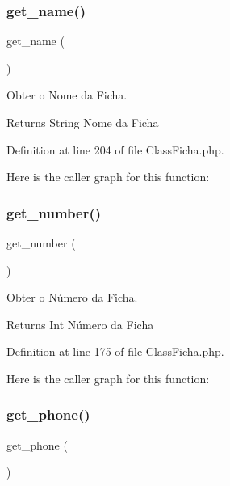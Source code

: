 \subsubsection{\texorpdfstring{get\+\_\+name()}{get\_name()}}
{\footnotesize\ttfamily get\+\_\+name (\begin{DoxyParamCaption}{ }\end{DoxyParamCaption})}



Obter o Nome da Ficha. 

\begin{DoxyReturn}{Returns}
String Nome da Ficha 
\end{DoxyReturn}


Definition at line 204 of file Class\+Ficha.\+php.

Here is the caller graph for this function\+:
\mbox{\label{class_class_ficha_a4f7969072fea809005ea1306a8e7ea83}} 
\subsubsection{\texorpdfstring{get\+\_\+number()}{get\_number()}}
{\footnotesize\ttfamily get\+\_\+number (\begin{DoxyParamCaption}{ }\end{DoxyParamCaption})}



Obter o Número da Ficha. 

\begin{DoxyReturn}{Returns}
Int Número da Ficha 
\end{DoxyReturn}


Definition at line 175 of file Class\+Ficha.\+php.

Here is the caller graph for this function\+:
\mbox{\label{class_class_ficha_a34c85b5b59e155044c316cb139684934}} 
\subsubsection{\texorpdfstring{get\+\_\+phone()}{get\_phone()}}
{\footnotesize\ttfamily get\+\_\+phone (\begin{DoxyParamCaption}{ }\end{DoxyParamCaption})}



